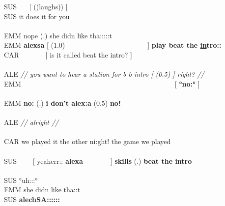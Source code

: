 \begin{inlinefrag}
\begin{transcript}
        \by SUS {~~~[ ((laughs)) ]} \\
        \by SUS {it does it for you} \\
         \\
        \by EMM {nope (.) she didn like tha:::::t} \\
        \by EMM {\textbf{alexsa} [ (1.0)~~~~~~~~~~~~~~~~~~~~~~~~] \textbf{play beat the \underline{in}tro::}} \\
        \by CAR {~~~~~~~[ is it called beat the intro? ]} \\
         \\
        \by ALE {\textit{// you want to hear a station for b b intro [ (0.5) ] right? //}} \\
        \by EMM {~~~~~~~~~~~~~~~~~~~~~~~~~~~~~~~~~~~~~~~~~~~~[ \textbf{°no:°} ] } \\
         \\
        \by EMM {\textbf{no:} (.) \textbf{i don't alex:a} (0.5) \textbf{no!}} \\
         \\
        \by ALE {\textit{// alrig\intUp{}ht //}} \\
         \\
        \by CAR {we played it the other ni:ght! the game we played} \\
         \\
        \by SUS {~~~~[ yeaherr:: \textbf{alexa}~~~~~~~~] \textbf{skills} (.) \textbf{beat the intro}} \\
         \\
        \by SUS {°uh::\intDown:° } \\
        \by EMM {she didn like tha:\intDown:t} \\
        \by SUS {\textbf{alechSA::::::}} \\
    \end{transcript}
\end{inlinefrag}


